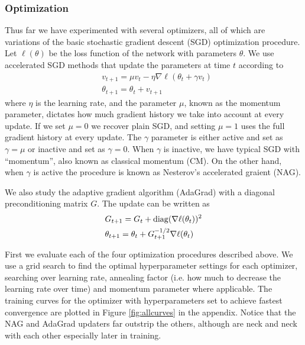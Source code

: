 \subsubsection*{Optimization}

Thus far we have experimented with several optimizers, all of which are
variations of the basic stochastic gradient descent (SGD) optimization
procedure. Let $\ell(\theta)$ be the loss function of the network with
parameters $\theta$. We use accelerated SGD methods that update the parameters
at time $t$ according to
\begin{align*}
&v_{t+1} = \mu v_t - \eta \nabla \ell (\theta_t + \gamma v_t) \\
&\theta_{t+1} = \theta_t + v_{t+1}
\end{align*}
where $\eta$ is the learning rate, and the parameter $\mu$, known as the momentum
parameter, dictates how much gradient history we take into account at every
update. If we set $\mu = 0$ we recover plain SGD, and setting $\mu = 1$ uses
the full gradient history at every update.  The $\gamma$ parameter is either
active and set as $\gamma = \mu$ or inactive and set as $\gamma = 0$.  When
$\gamma$ is inactive, we have typical SGD with ``momentum'', also known as
classical momentum (CM). On the other hand, when $\gamma$ is active the
procedure is known as Nesterov's accelerated graient (NAG).

We also study the adaptive gradient algorithm (AdaGrad) with a diagonal
preconditioning matrix $G$. The update can be written as
\begin{align*}
&G_{t+1} = G_{t} + \operatorname*{diag}(\nabla \ell (\theta_t))^2 \\
&\theta_{t+1} = \theta_t + G_{t+1}^{-1/2} \nabla \ell(\theta_t)
\end{align*} 

First we evaluate each of the four optimization procedures described above. We
use a grid search to find the optimal hyperparameter settings for each
optimizer, searching over learning rate, annealing factor (i.e. how much to
decrease the learning rate over time) and momentum parameter where applicable.
The training curves for the optimizer with hyperparameters set to achieve
fastest convergence are plotted in Figure \ref{fig:allcurves} in the appendix. Notice that the
NAG and AdaGrad updaters far outstrip the others, although are neck and neck
with each other especially later in training.

